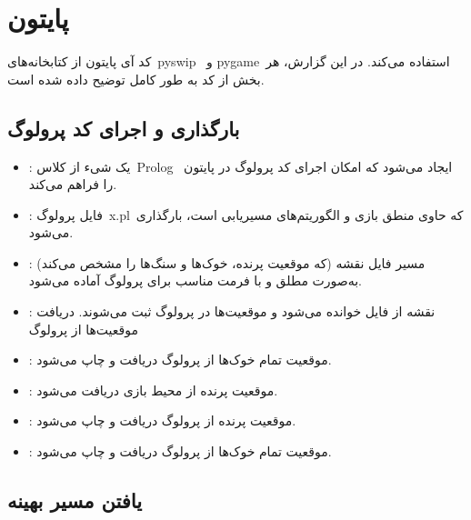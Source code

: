 \documentclass[11pt, a4paper, oneside]{article}
\begin{document}
		\section{پایتون}
		کد آی پایتون از کتابخانه‌های pyswip  و pygame استفاده می‌کند. در این گزارش، هر بخش از کد به طور کامل توضیح داده شده است.
		\subsection{
				بارگذاری و اجرای کد پرولوگ
		}
\begin{itemize}
	\item {}
	:  یک شیء از کلاس Prolog  ایجاد می‌شود که امکان اجرای کد پرولوگ در پایتون را فراهم می‌کند.
	\item {}
	: فایل پرولوگ x.pl که حاوی منطق بازی و الگوریتم‌های مسیریابی است، بارگذاری می‌شود.
	\item {} : مسیر فایل نقشه (که موقعیت پرنده، خوک‌ها و سنگ‌ها را مشخص می‌کند) به‌صورت مطلق و با فرمت مناسب برای پرولوگ آماده می‌شود.
	\item {} : نقشه از فایل خوانده می‌شود و موقعیت‌ها در پرولوگ ثبت می‌شوند.
	دریافت موقعیت‌ها از پرولوگ
	\item {} : موقعیت تمام خوک‌ها از پرولوگ دریافت و چاپ می‌شود.
	\item {} : موقعیت پرنده از محیط بازی دریافت می‌شود.
	\item {}: موقعیت پرنده از پرولوگ دریافت و چاپ می‌شود.
	\item {} : موقعیت تمام خوک‌ها از پرولوگ دریافت و چاپ می‌شود.
\end{itemize}
		
		\subsection{
				یافتن مسیر بهینه 
		}
	
\end{document}
